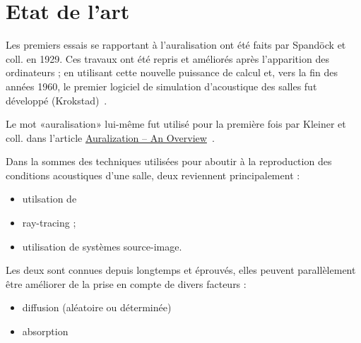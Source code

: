 \chapter{Etat de l'art}

Les premiers essais se rapportant à l'auralisation ont été faits par Spandöck et coll. en 1929.
Ces travaux ont été repris et améliorés après l'apparition des ordinateurs ; en utilisant cette nouvelle puissance de
calcul et, vers la fin des années 1960, le premier logiciel de simulation d'acoustique des salles fut développé
(Krokstad)~\cite{Vor08}.

Le mot «auralisation» lui-même fut utilisé pour la première fois par Kleiner et coll. dans l'article
\underline{Auralization -- An Overview}~\cite{Kle93}.

Dans la sommes des techniques utilisées pour aboutir à la reproduction des conditions acoustiques d'une salle, deux
reviennent principalement :

\begin{itemize}
    \item utilsation de \item{ray-tracing} ;
    \item utilisation de systèmes source-image.
\end{itemize}

Les deux sont connues depuis longtemps et éprouvés, elles peuvent parallèlement être améliorer de la prise en compte de
divers facteurs :

\begin{itemize}
    \item diffusion (aléatoire ou déterminée)
    \item absorption
\end{itemize}


